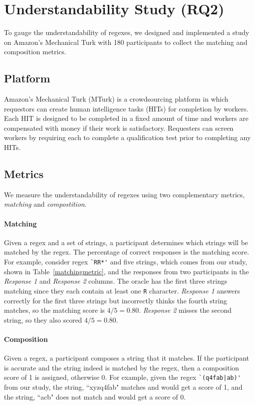 \section{Understandability Study (RQ2)}
\label{sec:understandability}
To gauge the understandability of regexes, we designed and implemented a study on Amazon's Mechanical Turk with 180 participants to collect the matching and composition metrics.

\subsection{Platform}
Amazon's Mechanical Turk (MTurk) is a crowdsourcing platform in which requestors can create human intelligence tasks (HITs) for completion by workers. Each HIT is designed to be completed in a fixed amount of time and workers are compensated with money if their work is satisfactory. Requesters can screen workers by requiring each to complete a qualification test prior to completing any HITs.

\subsection{Metrics}
\label{sec:understadningmetric}
 We measure the understandability of regexes using two complementary metrics, \emph{matching} and \emph{compostition}.


\paragraph{Matching}
 Given a regex and a set of strings, a participant determines which strings will be matched by the regex. The percentage of correct responses is the matching score. For example, consider regex \verb!`RR*'! and five strings, which comes from our study, shown in Table~\ref{matchingmetric}, and the responses from two participants in the \emph{Response 1} and \emph{Response 2} columns. The oracle has the first three strings matching since they each contain at least one \verb!R! character. \emph{Response 1} answers correctly for the first three strings but incorrectly thinks the fourth string matches, so the matching score is $4/5 = 0.80$. \emph{Response 2} misses the second string, so they also scored $4/5 = 0.80$.



\paragraph{Composition}
Given a regex, a participant composes a string that it matches. If the participant is accurate and the string indeed is matched by the regex, then a composition score of 1 is assigned, otherwise 0.  For example, given the regex \verb!`(q4fab|ab)'! from our study, the string, ``xyzq4fab" matches  and would get a score of 1, and the string, ``acb" does not match and would get a score of 0.

